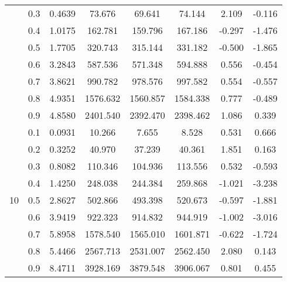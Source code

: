 \documentclass[11pt,a4paper]{report}
\begin{document}
\begin{longtable}{ | c | c || c | c | c | c | c | c | }
 & 0.3 & 0.4639 & 73.676 & 69.641 & 74.144 & 2.109 & -0.116 \\
 & 0.4 & 1.0175 & 162.781 & 159.796 & 167.186 & -0.297 & -1.476 \\
 & 0.5 & 1.7705 & 320.743 & 315.144 & 331.182 & -0.500 & -1.865 \\
 & 0.6 & 3.2843 & 587.536 & 571.348 & 594.888 & 0.556 & -0.454 \\
 & 0.7 & 3.8621 & 990.782 & 978.576 & 997.582 & 0.554 & -0.557 \\
 & 0.8 & 4.9351 & 1576.632 & 1560.857 & 1584.338 & 0.777 & -0.489 \\
 & 0.9 & 4.8580 & 2401.540 & 2392.470 & 2398.462 & 1.086 & 0.339 \\
 \hline
\multirow{9}{*}{10} & 0.1 & 0.0931 & 10.266 & 7.655 & 8.528 & 0.531 & 0.666 \\
 & 0.2 & 0.3252 & 40.970 & 37.239 & 40.361 & 1.851 & 0.163 \\
 & 0.3 & 0.8082 & 110.346 & 104.936 & 113.556 & 0.532 & -0.593 \\
 & 0.4 & 1.4250 & 248.038 & 244.384 & 259.868 & -1.021 & -3.238 \\
 & 0.5 & 2.8627 & 502.866 & 493.398 & 520.673 & -0.597 & -1.881 \\
 & 0.6 & 3.9419 & 922.323 & 914.832 & 944.919 & -1.002 & -3.016 \\
 & 0.7 & 5.8958 & 1578.540 & 1565.010 & 1601.871 & -0.622 & -1.724 \\
 & 0.8 & 5.4466 & 2567.713 & 2531.007 & 2562.450 & 2.080 & 0.143 \\
 & 0.9 & 8.4711 & 3928.169 & 3879.548 & 3906.067 & 0.801 & 0.455 \\
 \hline
\hline
\end{longtable}
\end{document}
